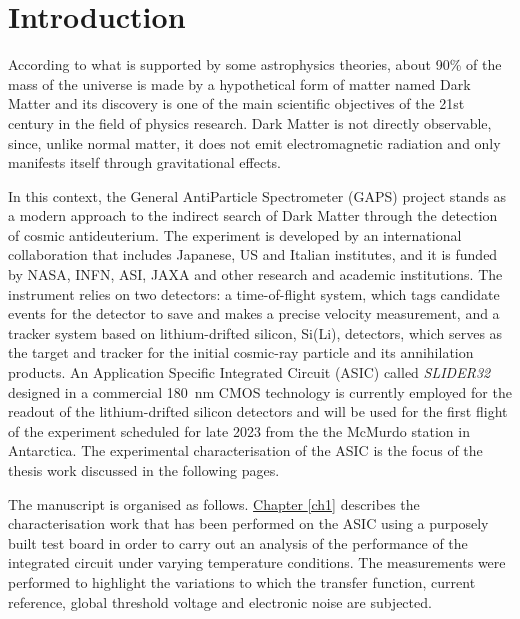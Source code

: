\chapter*{Introduction}  %

\par
According to what is supported by some astrophysics theories, about 90\% of the mass of the universe is made by a hypothetical form of matter named Dark Matter and its discovery is one of the main scientific objectives of the 21st century in the field of physics research. Dark Matter is not directly observable, since, unlike normal matter, it does not emit electromagnetic radiation and only manifests itself through gravitational effects. 

\par
In this context, the General AntiParticle Spectrometer (GAPS) project stands as a modern approach to the indirect search of Dark Matter through the detection of cosmic antideuterium. The experiment is developed by an international collaboration that includes Japanese, US and Italian institutes, and it is funded by NASA, INFN, ASI, JAXA and other research and academic institutions. The instrument relies on two detectors: a time-of-flight system, which tags candidate events for the detector to save and makes a precise velocity measurement, and a tracker system based on lithium-drifted silicon, Si(Li), detectors, which serves as the target and tracker for the initial cosmic-ray particle and its annihilation products. An Application Specific Integrated Circuit (ASIC) called \textit{SLIDER32} designed in a commercial \SI{180}{\nano\meter} CMOS technology is currently employed for the readout of the lithium-drifted silicon detectors and will be used for the first flight of the experiment scheduled for late 2023 from the the McMurdo station in Antarctica. The experimental characterisation of the ASIC is the focus of the thesis work discussed  in the following pages.

\par
The manuscript is organised as follows. \hyperref[ch1]{Chapter \ref{ch1}} describes the characterisation work that has been performed on the ASIC using a purposely built test board in order to carry out an analysis of the performance of the integrated circuit under varying temperature conditions. The measurements were performed to highlight the variations to which the transfer function, current reference, global threshold voltage and electronic noise are subjected.

